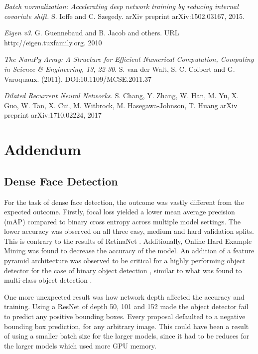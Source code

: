 \documentclass[a4paper, twoside]{article}
\begin{document}
\begin{thebibliography}{99}
	\textit{Batch normalization: Accelerating deep network training by reducing internal covariate shift.}
    S. Ioffe and C. Szegedy. 
	arXiv preprint arXiv:1502.03167, 2015.

\textit{Eigen v3}.
G. Guennebaud and B. Jacob and others. URL http://eigen.tuxfamily.org. 2010

\textit{The NumPy Array: A Structure for Efficient Numerical Computation, Computing in Science \& Engineering, 13, 22-30}.
S. van der Walt, S. C. Colbert and G. Varoquaux.  (2011), DOI:10.1109/MCSE.2011.37 

	\textit{Dilated Recurrent Neural Networks.}
	S. Chang, Y. Zhang, W. Han, M. Yu, X. Guo, W. Tan, X. Cui, M. Witbrock, M. Hasegawa-Johnson, T. Huang
	arXiv preprint arXiv:1710.02224, 2017

\end{thebibliography}

\newpage
\section*{Addendum}
\subsection*{Dense Face Detection}
For the task of dense face detection, the outcome was vastly different from the expected outcome. Firstly, focal loss yielded a lower mean average precision (mAP) compared to binary cross entropy across multiple model settings. The lower accuracy was observed on all three easy, medium and hard validation splits. This is contrary to the results of RetinaNet \cite{retinanet}. Additionally, Online Hard Example Mining was found to decrease the accuracy of the model. An addition of a feature pyramid architecture was observed to be critical for a highly performing object detector for the case of binary object detection , similar to what was found to multi-class object detection \cite{retinanet}.

One more unexpected result was how network depth affected the accuracy and training. Using a ResNet of depth 50, 101 and 152 made the object detector fail to predict any positive bounding boxes. Every proposal defaulted to a negative bounding box prediction, for any arbitrary image. This could have been a result of using a smaller batch size for the larger models, since it had to be reduces for the larger models which used more GPU memory.
\end{document}
